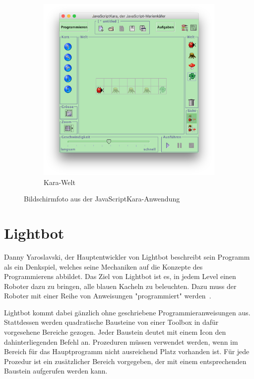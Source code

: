 \begin{figure}
\begin{subfigure}[b]{0.5\textwidth}
        \includegraphics[width=\textwidth]{gfx/related-kara-world.png}
        \caption{Kara-Welt}
        \label{fig:related:kara:world}
    \end{subfigure}
    \caption{Bildschirmfoto aus der JavaScriptKara-Anwendung}
    \label{fig:related:kara}
\end{figure}

\section{Lightbot}
\label{sec:related:lightbot}

Danny Yaroslavski, der Hauptentwickler von Lightbot beschreibt sein Programm als ein Denkspiel, welches seine Mechaniken auf die Konzepte des Programmierens abbildet. Das Ziel von Lightbot ist es, in jedem Level einen Roboter dazu zu bringen, alle blauen Kacheln zu beleuchten. Dazu muss der Roboter mit einer Reihe von Anweisungen "programmiert" werden~\cite{yaroslavski2014}.

Lightbot kommt dabei gänzlich ohne geschriebene Programmieranweisungen aus. Stattdessen werden quadratische Bausteine von einer Toolbox in dafür vorgesehene Bereiche gezogen. Jeder Baustein deutet mit einem Icon den dahinterliegenden Befehl an. Prozeduren müssen verwendet werden, wenn im Bereich für das Hauptprogramm nicht ausreichend Platz vorhanden ist. Für jede Prozedur ist ein zusätzlicher Bereich vorgegeben, der mit einem entsprechenden Baustein aufgerufen werden kann.

